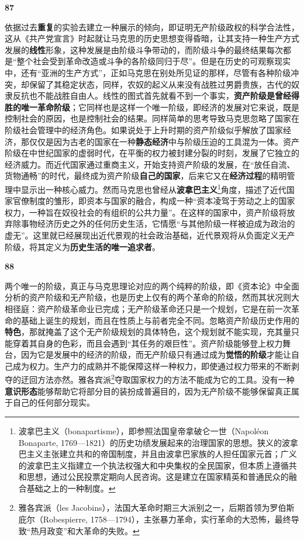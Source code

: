\documentclass[fontset=fandol, a4paper, 12pt, openright]{ctexbook}
\makeatletter
\newcommand{\thesis}[1]{%
    \par\vspace{1.5em}%
    {\centering \textbf{\Large #1}\par}%
    \nobreak\vspace{0.5em}\nobreak
    \@afterindenttrue %
    \@afterheading    %
}
\makeatother
\begin{document}
\thesis{87}
依据过去\textbf{重复}的实验去建立一种展示的倾向，即证明无产阶级政权的科学合法性，这从《共产党宣言》时起就让马克思的历史思想变得昏暗，让其支持一种生产方式发展的\textbf{线性}形象，这种发展是由阶级斗争带动的，而阶级斗争的最终结果每次都是“整个社会受到革命改造或斗争的各阶级同归于尽”。但是在历史的可观察现实中，还有“亚洲的生产方式”，正如马克思在别处所见证的那样，尽管有各种阶级冲突，却保留了其稳定状态，同样，农奴的起义从来没有战胜过男爵贵族，古代的奴隶反抗也不能战胜自由人。线性的图式首先就看不到一个事实，\textbf{资产阶级是曾经得胜的唯一革命阶级}；它同样也是这样一个唯一阶级，即经济的发展对它来说，既是控制社会的原因，也是控制社会的结果。同样简单的思考导致马克思忽略了国家在阶级社会管理中的经济角色。如果说处于上升时期的资产阶级似乎解放了国家经济，那仅仅是因为古老的国家在一种\textbf{静态经济}中与阶级压迫的工具混为一体。资产阶级在中世纪国家的虚弱时代，在平衡的权力被封建分裂的时刻，发展了它独立的经济威力。而近代国家通过重商主义，开始支持资产阶级的发展，在“放任自流、货物通畅”的时代，最终成为资产阶级\textbf{自己的国家}，后来它又在\textbf{经济过程}的精明管理中显示出一种核心威力。然而马克思也曾经从\textbf{波拿巴主义}\footnote{波拿巴主义（bonapartisme），即参照法国皇帝拿破仑一世（Napoléon Bonaparte, 1769—1821）的历史功绩发展起来的治理国家的思想。狭义的波拿巴主义主张建立共和的帝国制度，并且由波拿巴家族的人担任国家元首；广义的波拿巴主义指建立一个执法权强大和中央集权的全民国家，但本质上遵循共和思想，通过公民投票定期向人民咨询。这是建立在国家精英和普通民众的融合基础之上的一种制度。}角度，描述了近代国家官僚制度的雏形，即资本与国家的融合，构成一种“资本凌驾于劳动之上的国家权力，一种旨在奴役社会的有组织的公共力量”。在这样的国家中，资产阶级将放弃除事物经济历史之外的任何历史生活，它情愿“与其他阶级一样被迫成为政治的虚无”。这里就已经展现出近代景观的社会政治基础，近代景观将从负面定义无产阶级，将其定义为\textbf{历史生活的唯一追求者}。

\thesis{88}
两个唯一的阶级，真正与马克思理论对应的两个纯粹的阶级，即《资本论》中全面分析的资产阶级和无产阶级，也是历史上仅有的两个革命的阶级，然而其状况则大相径庭：资产阶级革命业已完成；无产阶级革命还只是一个规划，它是在前一次革命的基础上诞生的规划，而且在性质上与前者完全不同。忽略资产阶级历史作用的\textbf{特色}，那就掩盖了这个无产阶级规划的具体特色，这个规划就不能实现，充其量只能穿着其自身的色彩，而且会遇到“其任务的艰巨性”。资产阶级能够登上权力舞台，因为它是发展中的经济的阶级，而无产阶级只有通过成为\textbf{觉悟的阶级}才能让自己成为权力。生产力的成熟并不能保障这样一种权力，即使通过权力带来的不断剥夺的迂回方法亦然。雅各宾派\footnote{雅各宾派（les Jacobins），法国大革命时期三大派别之一，后期首领为罗伯斯庇尔（Robespierre, 1758—1794），主张暴力革命，实行革命的大恐怖，最终导致“热月政变”和大革命的失败。}夺取国家权力的方法不能成为它的工具。没有一种\textbf{意识形态}能够帮助它将部分目的装扮成普遍目的，因为无产阶级不能够保留真正属于自己的任何部分现实。
\end{document}
